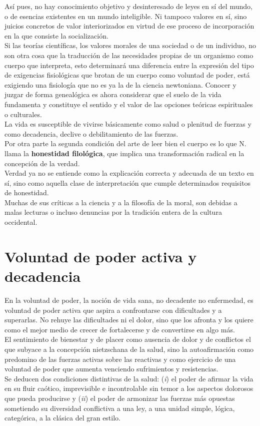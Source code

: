 \documentclass[a4paper, 10pt, twocolumn, spanish]{article}
\begin{document}
Así pues, no hay conocimiento objetivo y desinteresado de leyes en sí
del mundo, o de esencias existentes en un mundo inteligible. Ni
tampoco valores en sí, sino juicios concretos de valor interiorizados
en virtud de ese proceso de incorporación en la que consiste la
socialización.\\[0pt]
Si las teorías científicas, los valores morales de una sociedad o de
un individuo, no son otra cosa que la traducción de las necesidades
propias de un organismo como cuerpo que interpreta, esto determinará
una diferencia entre la expresión del tipo de exigencias fisiológicas
que brotan de un cuerpo como voluntad de poder, está exigiendo una
fisiología que no es ya la de la ciencia newtoniana. Conocer y juzgar
de forma genealógica es ahora considerar que el suelo de la vida
fundamenta y constituye el sentido y el valor de las opciones teóricas
espirituales o culturales.\\[0pt]
La vida es susceptible de vivirse básicamente como salud o plenitud de
fuerzas y como decadencia, declive o debilitamiento de las fuerzas.\\[0pt]
Por otra parte la segunda condición del arte de leer bien el cuerpo es
lo que N. llama la \textbf{honestidad filológica}, que implica una
transformación radical en la concepción de la verdad.\\[0pt]
Verdad ya no se entiende como la explicación correcta y adecuada de un
texto en sí, sino como aquella clase de interpretación que cumple
determinados requisitos de honestidad.\\[0pt]
Muchas de sus críticas a la ciencia y a la filosofía de la moral, son
debidas a malas lecturas o incluso denuncias por la tradición entera
de la cultura occidental.

\section{Voluntad de poder activa y decadencia}
\label{sec:org9c2c1e4}
En la voluntad de poder, la noción de vida sana, no decadente no
enfermedad, es voluntad de poder activa que aspira a confrontarse con
dificultades y a superarlas. No rehuye las dificultades ni el dolor,
sino que los afronta y los quiere como el mejor medio de crecer de
fortalecerse y de convertirse en algo más.\\[0pt]

El sentimiento de bienestar y de placer como ausencia de dolor y de
conflictos el que subyace a la concepción nietzschana de la salud,
sino la autoafirmación como predomino de las fuerzas activas sobre las
reactivas y como ejercicio de una voluntad de poder que aumenta
venciendo sufrimientos y resistencias.\\[0pt]
Se deducen dos condiciones distintivas de la salud: (\emph{i}) el poder de
afirmar la vida en su fluir caótico, imprevisible e incontrolable sin
temor a los aspectos dolorosos que pueda producirse y (\emph{ii}) el poder
de armonizar las fuerzas más opuestas sometiendo su diversidad
conflictiva a una ley, a una unidad simple, lógica, categórica, a la
clásica del gran estilo.\\[0pt]
\end{document}
